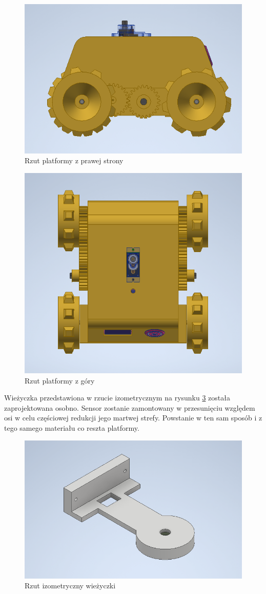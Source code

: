 \begin{figure}[H]
	\centering
		\includegraphics[width=0.5\linewidth]{rys/view2.png}
	\caption{Rzut platformy z prawej strony}
	\label{fig:view2}
\end{figure}

\begin{figure}[H]
	\centering
		\includegraphics[width=0.5\linewidth]{rys/view3.png}
	\caption{Rzut platformy z góry}
	\label{fig:view3}
\end{figure}

Wieżyczka przedstawiona w rzucie izometrycznym na rysunku \ref{fig:tower} została zaprojektowana osobno. Sensor zostanie zamontowany w przesunięciu względem osi w celu częściowej redukcji jego martwej strefy. Powstanie w ten sam sposób i z tego samego materiału co reszta platformy.

\begin{figure}[ht]
	\centering
		\includegraphics[width=0.5\linewidth]{rys/arm.png}
	\caption{Rzut izometryczny wieżyczki}
	\label{fig:tower}
\end{figure}


